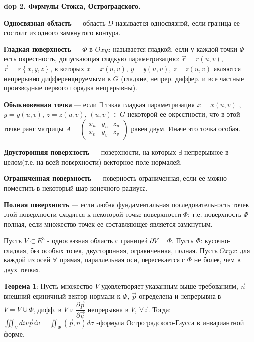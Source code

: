 \textbf{\LARGE dop 2. Формулы Стокса, Остроградского.}



\par \textbf{Односвязная область} --- область $D$ называется односвязной, если
граница ее состоит из одного замкнутого контура.

\par \textbf{Гладкая поверхность} --- $\Phi$ в $Oxyz$ называется гладкой, если у каждой точки $\Phi$ есть окрестность, допускающая гладкую параметризацию: $\overrightarrow{r}=r\left( u,v\right)$,  $\overrightarrow{r}=r\left\{ x,y,z\right\}$, в которых $x = x\left( u,v\right)$, $y = y\left( u,v\right)$, $z = z\left( u,v\right)$ являются непрерывно дифференцируемыми в $G$ (гладкие, непрер. диффер. и все частные производные первого порядка непрерывны).

\par \textbf{Обыкновенная точка} --- если $\exists$ такая гладкая параметризация $x = x\left( u,v\right)$ , $y = y\left( u,v\right)$, $z = z\left( u,v\right)$, $\left( u,v\right) \in G$ некоторой ее окрестности, что в этой точке ранг матрицы $A=\begin{pmatrix} x_{u} & y_{u} & z_{u} \\ x_{v} & y_{v} & z_{v} \end{pmatrix}$ равен двум. Иначе это точка особая.

\par \textbf{Двусторонняя поверхность} --- поверхности, на которых $\exists$ непрерывное в целом(т.е. на всей поверхности) векторное поле нормалей.

\par \textbf{Ограниченная поверхность} --- поверность ограниченная, если ее можно поместить в некоторый шар конечного радиуса.

\par \textbf{Полная поверхность} --- если любая фундаментальная последовательность точек этой поверхности сходится к некоторой точке поверхности $\Phi$; т.е. поверхность $\Phi$ полная, если множество точек ее составляющее является замкнутым.

\par Пусть $V\subset E^{3}$ - односвязная область с границей $\partial V=\Phi $. Пусть $\Phi$: кусочно-гладкая, без особых точек, двусторонняя, ограниченная, полная. Пусть $Oxyz$: для каждой из осей $\forall$ прямая, параллельная оси, пересекается с $\Phi$ не более, чем в двух точках.
\par \textbf{Теорема 1}: Пусть множество $V$ удовлетворяет указанным выше требованиям, $\overrightarrow{n}$– внешний единичный вектор нормали к $\Phi$, $\overrightarrow{p}$ определена и непрерывна в $\overline{V}=V\cup \Phi$, дифф. в $V$ и $\dfrac{\partial \overrightarrow{p}}{\partial \overrightarrow{e}}$ непрерывна в $\overline{V}$, $\forall \overrightarrow{e}$.
Тогда: $\iiint _{\overline{V}}div\overrightarrow{p}dv=\iint _{\Phi }\left( \overrightarrow{p},\overline{n}\right) d\sigma$ -формула Остроградского-Гаусса в инвариантной форме.

